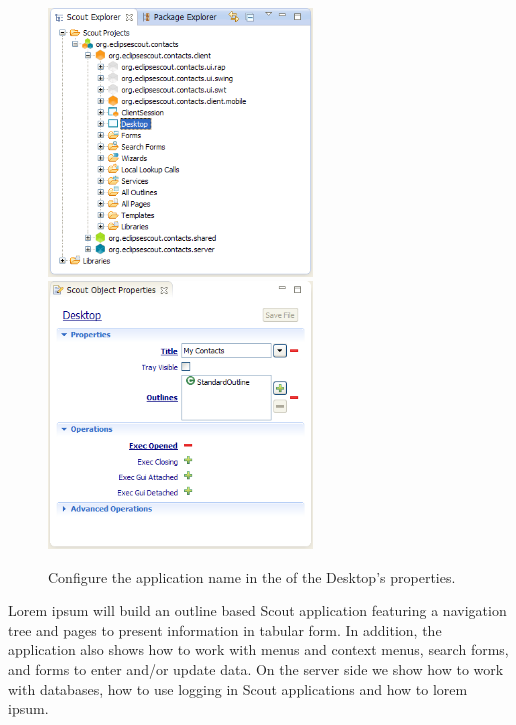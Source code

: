 \documentclass[a4paper,10pt,twoside]{book}
\begin{document}
\begin{figure}
\includegraphics[width=7cm]{desktop_explorer.png} \hspace{5mm}
\includegraphics[width=7cm]{desktop_properties.png}
\caption{Configure the application name in the  of the Desktop's properties. }
\end{figure}

Lorem ipsum will build an outline based Scout application featuring a navigation tree and pages to present information in tabular form. 
In addition, the application also shows how to work with menus and context menus, search forms, and forms to enter and/or update data. 
On the server side we show how to work with databases, how to use logging in Scout applications and how to lorem ipsum. 
\end{document}
